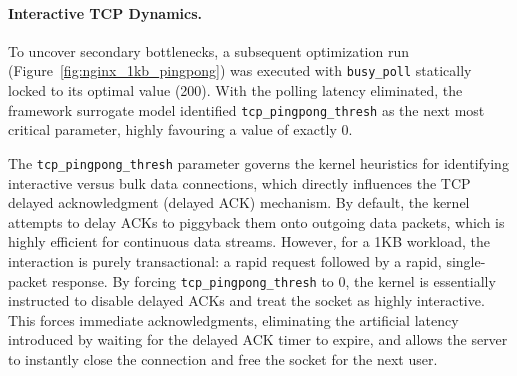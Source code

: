 \paragraph{Interactive TCP Dynamics.}
To uncover secondary bottlenecks, a subsequent optimization run  (Figure~\ref{fig:nginx_1kb_pingpong}) was executed with \texttt{busy\_poll} statically locked to its optimal value (200).
With the polling latency eliminated, the framework surrogate model identified \texttt{tcp\_pingpong\_thresh} as the next most critical parameter, highly favouring a value of exactly 0.

The \texttt{tcp\_pingpong\_thresh} parameter governs the kernel heuristics for identifying interactive versus bulk data connections, which directly influences the TCP delayed acknowledgment (delayed ACK) mechanism.
By default, the kernel attempts to delay ACKs to piggyback them onto outgoing data packets, which is highly efficient for continuous data streams.
However, for a 1KB workload, the interaction is purely transactional: a rapid request followed by a rapid, single-packet response.
By forcing \texttt{tcp\_pingpong\_thresh} to 0, the kernel is essentially instructed to disable delayed ACKs and treat the socket as highly interactive.
This forces immediate acknowledgments, eliminating the artificial latency introduced by waiting for the delayed ACK timer to expire, and allows the server to instantly close the connection and free the socket for the next user.

